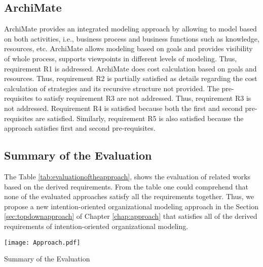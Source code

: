 \subsection{ArchiMate}
ArchiMate provides an integrated modeling approach by allowing to model based on both activities, i.e., business process and business functions such as knowledge, resources, etc. ArchiMate allows modeling based on goals and provides visibility of whole process, supports viewpoints in different levels of modeling. Thus, requirement R1 is addressed. ArchiMate does cost calculation based on goals and resources. Thus, requirement R2 is partially satisfied as details regarding the cost calculation of strategies and its recursive structure not provided. The pre-requisites to satisfy requirement R3 are not addressed. Thus, requirement R3 is not addressed. Requirement R4 is satisfied because both the first and second pre-requisites are satisfied. Similarly, requirement R5 is also satisfied because the approach satisfies first and second pre-requisites.  

\subsection {Summary of the Evaluation}
 The Table \ref{tab:evaluationoftheapproach}, shows the evaluation of related works based on the derived requirements. From the table one could comprehend that none of the evaluated approaches satisfy all the requirements together. Thus, we propose a new intention-oriented organizational modeling approach in the Section \ref{sec:topdownapproach} of Chapter \ref{chap:approach} that satisfies all of the derived requirements of intention-oriented organizational modeling. 

 \begin{table}
 	\centering
 	\texttt{[image: Approach.pdf]}
 	\caption{Summary of the Evaluation}
 	\label{tab:evaluationoftheapproach}
 \end{table} 



